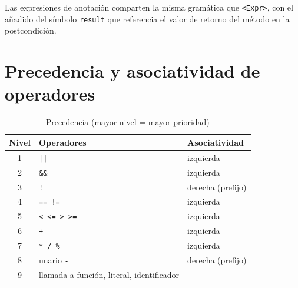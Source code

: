 Las expresiones de anotación comparten la misma gramática que
\texttt{<Expr>}, con el añadido del símbolo \texttt{result} que
referencia el valor de retorno del método en la postcondición.

\section{Precedencia y asociatividad de operadores}

\begin{table}[H]
  \centering
  \caption{Precedencia (mayor nivel = mayor prioridad)}
  \label{tab:prec}
  \begin{tabular}{cll}
    \toprule
    \textbf{Nivel} & \textbf{Operadores} & \textbf{Asociatividad} \\
    \midrule
    1 & \texttt{||} & izquierda \\
    2 & \texttt{\&\&} & izquierda \\
    3 & \texttt{!} & derecha (prefijo) \\
    4 & \texttt{== !=} & izquierda \\
    5 & \texttt{< <= > >=} & izquierda \\
    6 & \texttt{+ -} & izquierda \\
    7 & \texttt{* / \%} & izquierda \\
    8 & unario \texttt{-} & derecha (prefijo) \\
    9 & llamada a función, literal, identificador & --- \\
    \bottomrule
  \end{tabular}
\end{table}
